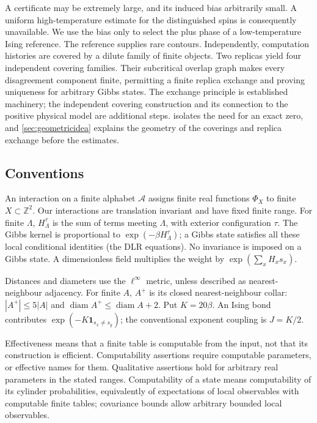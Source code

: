 \documentclass[11pt,reqno]{amsart}
\numberwithin{equation}{section}
\theoremstyle{definition}
\theoremstyle{remark}
\newcommand{\Z}{\mathbb Z}
\newcommand{\one}{\mathbf1}
\newcommand{\diam}{\operatorname{diam}}
\begin{document}
A certificate may be extremely large, and its induced bias arbitrarily small. A uniform high-temperature estimate for the distinguished spins is consequently unavailable. We use the bias only to select the plus phase of a low-temperature Ising reference. The reference supplies rare contours. Independently, computation histories are covered by a dilute family of finite objects. Two replicas yield four independent covering families. Their subcritical overlap graph makes every disagreement component finite, permitting a finite replica exchange and proving uniqueness for arbitrary Gibbs states. The exchange principle is established machinery; the independent covering construction and its connection to the positive physical model are additional steps.  isolates the need for an exact zero, and \cref{sec:geometricidea} explains the geometry of the coverings and replica exchange before the estimates.

\subsection{Conventions}
An interaction on a finite alphabet $\mathcal A$ assigns finite real functions $\Phi_X$ to finite $X\subset\Z^2$. Our interactions are translation invariant and have fixed finite range. For finite $\Lambda$, $H_\Lambda^\tau$ is the sum of terms meeting $\Lambda$, with exterior configuration $\tau$. The Gibbs kernel is proportional to $\exp(-\beta H_\Lambda^\tau)$; a Gibbs state satisfies all these local conditional identities (the DLR equations). No invariance is imposed on a Gibbs state. A dimensionless field multiplies the weight by $\exp(\sum_x H_xs_x)$.

Distances and diameters use the $\ell^\infty$ metric, unless described as nearest-neighbour adjacency. For finite $A$, $A^+$ is its closed nearest-neighbour collar: $|A^+|\leq5|A|$ and $\diam A^+\leq\diam A+2$. Put $K=20\beta$. An Ising bond contributes $\exp(-K\one_{s_x\ne s_y})$; the conventional exponent coupling is $J=K/2$.

Effectiveness means that a finite table is computable from the input, not that its construction is efficient. Computability assertions require computable parameters, or effective names for them. Qualitative assertions hold for arbitrary real parameters in the stated ranges. Computability of a state means computability of its cylinder probabilities, equivalently of expectations of local observables with computable finite tables; covariance bounds allow arbitrary bounded local observables.
\end{document}
